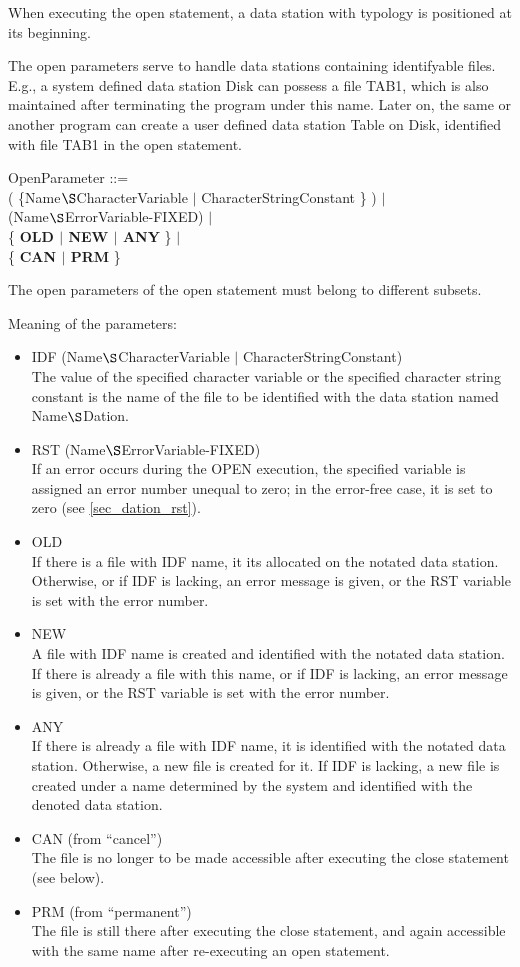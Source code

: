 When executing the open statement, a data station with typology is
positioned at its beginning.

The open parameters serve to handle data stations containing
identifyable files. E.g., a system defined data station Disk can possess
a file TAB1, which is also maintained after terminating the program
under this name. Later on, the same or another program can create a user
defined data station Table on Disk, identified with file TAB1 in the
open statement.

OpenParameter ::=\\
 ( \{Name$\S $CharacterVariable $\mid$ CharacterStringConstant \} ) $\mid$\\
 (Name$\S $ErrorVariable-FIXED) $\mid$ \\
\x \{ {\bf OLD $\mid$ NEW $\mid$ ANY} \} $\mid$ \\
\x \{ {\bf CAN $\mid$ PRM} \}

The open parameters of the open statement must belong to different
subsets.

Meaning of the parameters:
\begin{itemize}
\item IDF (Name$\S $CharacterVariable $\mid$ CharacterStringConstant)\\
The value of the specified character variable or the specified character
string constant is the name of the file to be identified with the data
station named Name$\S $Dation.
\item RST (Name$\S $ErrorVariable-FIXED)\\
If an error occurs during the OPEN execution, the specified variable is
assigned an error number unequal to zero; in the error-free case, it is
set to zero (see \ref{sec_dation_rst}).
\item OLD\\
If there is a file with IDF name, it its allocated on the notated data
station. Otherwise, or if IDF is lacking, an error message is given, or
the RST variable is set with the error number.
\item NEW\\
A file with IDF name is created and identified with the notated data
station. If there is already a file with this name, or if IDF is
lacking, an error message is given, or the RST variable is set with the
error number.
\item ANY\\
If there is already a file with IDF name, it is identified with the
notated data station. Otherwise, a new file is created for it. If IDF
is lacking, a new file is created under a name determined by the system
and identified with the denoted data station.
\item CAN (from ``cancel'')\\
The file is no longer to be made accessible after executing the close
statement (see below).
\item PRM (from ``permanent'')\\
The file is still there after executing the close statement, and again
accessible with the same name after re-executing an open statement.
\end{itemize}

